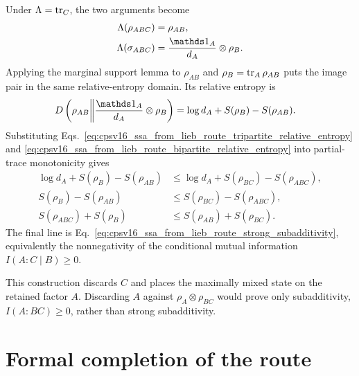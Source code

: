 \documentclass[11pt]{article}
\begin{document}
\begin{enumerate}
    Under $\Lambda=\operatorname{tr}_C$, the two arguments become
    \begin{align}
        \Lambda(\rho_{ABC})
            &= \rho_{AB},
        \label{eq:cpsv16_ssa_from_lieb_route_partial_trace_state}\\
        \Lambda(\sigma_{ABC})
            &= \frac{\Id_A}{d_A}\otimes\rho_B.
        \label{eq:cpsv16_ssa_from_lieb_route_partial_trace_reference}
    \end{align}
    Applying the marginal support lemma to $\rho_{AB}$ and
    $\rho_B=\operatorname{tr}_A\rho_{AB}$ puts the image pair in the same relative-entropy
    domain. Its relative entropy is
    \begin{align}
        D\left(\rho_{AB} \middle\|
          \frac{\Id_A}{d_A}\otimes\rho_B\right)
            &= \log d_A+S(\rho_B)-S(\rho_{AB}).
        \label{eq:cpsv16_ssa_from_lieb_route_bipartite_relative_entropy}
    \end{align}
    Substituting
    Eqs.~\ref{eq:cpsv16_ssa_from_lieb_route_tripartite_relative_entropy} and
    \ref{eq:cpsv16_ssa_from_lieb_route_bipartite_relative_entropy} into
    partial-trace monotonicity gives
    \begin{align}
        \log d_A+S(\rho_B)-S(\rho_{AB})
            &\leq
            \log d_A+S(\rho_{BC})-S(\rho_{ABC}),
        \label{eq:cpsv16_ssa_from_lieb_route_entropy_data_processing}\\
        S(\rho_B)-S(\rho_{AB})
            &\leq S(\rho_{BC})-S(\rho_{ABC}),
        \label{eq:cpsv16_ssa_from_lieb_route_conditional_entropy_order}\\
        S(\rho_{ABC})+S(\rho_B)
            &\leq S(\rho_{AB})+S(\rho_{BC}).
        \label{eq:cpsv16_ssa_from_lieb_route_ssa_assembly}
    \end{align}
    The final line is
    Eq.~\ref{eq:cpsv16_ssa_from_lieb_route_strong_subadditivity}, equivalently
    the nonnegativity of the conditional mutual information
    $I(A:C\mid B)\geq0$.

    This construction discards $C$ and places the maximally mixed state on the
    retained factor $A$. Discarding $A$ against
    $\rho_A\otimes\rho_{BC}$ would prove only subadditivity,
    $I(A:BC)\geq0$, rather than strong subadditivity.
\end{enumerate}

\section{Formal completion of the route}
\end{document}
